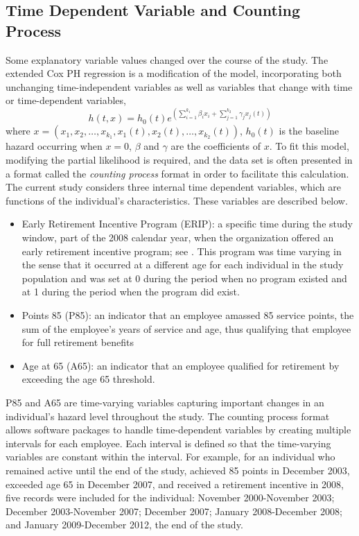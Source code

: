 \subsection{Time Dependent Variable and Counting Process}
\label{sec:coxt}
Some explanatory variable values changed over the course of the study. The extended Cox PH regression is a modification of the model, incorporating both unchanging time-independent variables as well as variables that change with time or time-dependent variables,
\begin{equation}
\label{eq:timecovar}
h(t,x)=h_0(t)e^{(\sum_{i=1}^{k_1}\beta_ix_i+\sum_{j=1}^{k_2}\gamma_jx_j(t))}
\end{equation}
where $x=(x_1, x_2, \ldots, x_{k_1}, x_1(t), x_2(t), \ldots, x_{k_2}(t))$, $h_0(t)$ is the baseline hazard occurring when $x=0$, $\beta$ and $\gamma$ are the coefficients of $x$. To fit this model, modifying the partial likelihood is required, and the data set is often presented in a format called the {\it counting process} format in order to facilitate this calculation. The current study considers three internal time dependent variables, which are functions of the individual's characteristics. These variables are described below.
\begin{itemize}
	\item Early Retirement Incentive Program (ERIP): a specific time during the study window, part of the 2008 calendar year, when the organization offered an early retirement incentive program; see \citet{ERIP}. This program was time varying in the sense that it occurred at a different age for each individual in the study population and was set at 0 during the period when no program existed and at 1 during the period when the program did exist.
	\item Points 85 (P85): an indicator that an employee amassed 85 service points, the sum of the employee's years of service and age, thus qualifying that employee for full retirement benefits
	\item Age at 65 (A65): an indicator that an employee qualified for retirement by exceeding the age 65 threshold.
\end{itemize}
P85 and A65 are time-varying variables capturing important changes in an individual's hazard level throughout the study. 
The counting process format allows software packages to handle time-dependent variables by creating multiple intervals for each employee. Each interval is defined so that the time-varying variables are constant within the interval.  For example, for an individual who remained active until the end of the study, achieved 85 points in December 2003, exceeded age 65 in December 2007, and received a retirement incentive in 2008, five records were included for the individual:  November 2000-November 2003; December 2003-November 2007; December 2007; January 2008-December 2008; and January 2009-December 2012, the end of the study.

